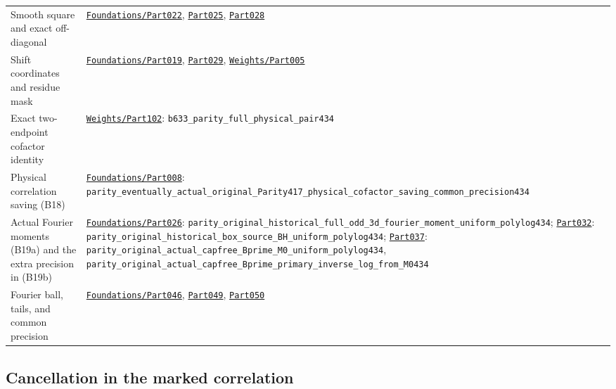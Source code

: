 \begin{longtable}[]{@{}
  >{\raggedright\arraybackslash}p{}
  >{\raggedright\arraybackslash}p{}@{}}
Smooth square and exact off-diagonal &
\href{../Green64/Library/Sieve/Foundations/Part022.lean}{\nolinkurl{Foundations/Part022}},
\href{../Green64/Library/Sieve/Foundations/Part025.lean}{\nolinkurl{Part025}},
\href{../Green64/Library/Sieve/Foundations/Part028.lean}{\nolinkurl{Part028}} \\
Shift coordinates and residue mask &
\href{../Green64/Library/Sieve/Foundations/Part019.lean}{\nolinkurl{Foundations/Part019}},
\href{../Green64/Library/Sieve/Foundations/Part029.lean}{\nolinkurl{Part029}},
\href{../Green64/Library/Weights/Part005.lean}{\nolinkurl{Weights/Part005}} \\
Exact two-endpoint cofactor identity &
\href{../Green64/Library/Weights/Part102.lean}{\nolinkurl{Weights/Part102}}:
{\small\nolinkurl{b633_parity_full_physical_pair434}} \\
Physical correlation saving (B18) &
\href{../Green64/Library/Sieve/Foundations/Part008.lean}{\nolinkurl{Foundations/Part008}}:
{\small\nolinkurl{parity_eventually_actual_original_Parity417_physical_cofactor_saving_common_precision434}} \\
Actual Fourier moments (B19a) and the extra precision in (B19b) &
\href{../Green64/Library/Sieve/Foundations/Part026.lean}{\nolinkurl{Foundations/Part026}}:
{\small\nolinkurl{parity_original_historical_full_odd_3d_fourier_moment_uniform_polylog434}};
\href{../Green64/Library/Sieve/Foundations/Part032.lean}{\nolinkurl{Part032}}:
{\small\nolinkurl{parity_original_historical_box_source_BH_uniform_polylog434}};
\href{../Green64/Library/Sieve/Foundations/Part037.lean}{\nolinkurl{Part037}}:
{\small\nolinkurl{parity_original_actual_capfree_Bprime_M0_uniform_polylog434}},
{\small\nolinkurl{parity_original_actual_capfree_Bprime_primary_inverse_log_from_M0434}} \\
Fourier ball, tails, and common precision &
\href{../Green64/Library/Sieve/Foundations/Part046.lean}{\nolinkurl{Foundations/Part046}},
\href{../Green64/Library/Sieve/Foundations/Part049.lean}{\nolinkurl{Part049}},
\href{../Green64/Library/Sieve/Foundations/Part050.lean}{\nolinkurl{Part050}} \\
\end{longtable}


\hypertarget{marked-correlation-correspondence-with-lean}{%
\subsection{Cancellation in the marked
correlation}\label{marked-correlation-correspondence-with-lean}}

